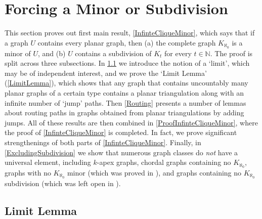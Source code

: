 \documentclass[a4paper,11pt]{article}
\theoremstyle{plain}
\theoremstyle{definition}
\newcommand{\NN}{\mathbb{N}}
\begin{document}
\section{Forcing a Minor or Subdivision}
\label{ForcingMinor}

This section proves out first main result, \cref{InfinteCliqueMinor}, which says that if a graph $U$  contains every planar graph, then (a) the complete graph $K_{\aleph_0}$ is a minor of $U$, and (b) $U$ contains a subdivision of $K_t$ for every $t\in\NN$. The proof is split across three subsections. In \cref{Limits} we introduce the notion of a `limit', which may be of independent interest, and we prove the `Limit Lemma' (\cref{LimitLemma}), which shows that any graph that contains uncountably many planar graphs of a certain type contains a planar triangulation along with an infinite number of `jump' paths. Then \cref{Routing} presents a number of lemmas about routing paths in graphs obtained from planar triangulations by adding  jumps. All of these results are then combined in \cref{ProofInfinteCliqueMinor}, where the proof of \cref{InfinteCliqueMinor} is completed. In fact, we prove significant strengthenings of both parts of \cref{InfinteCliqueMinor}. Finally, in \cref{ExcludingSubdivision} we show that numerous graph classes do \emph{not} have a universal element, including $k$-apex graphs, chordal graphs containing no $K_{\aleph_0}$, graphs with no $K_{\aleph_0}$ minor (which was proved in \cite{DHV85}), and graphs containing no $K_{\aleph_0}$ subdivision (which was left open in \cite{DHV85}).


\subsection{Limit Lemma}
\label{Limits}
\end{document}
